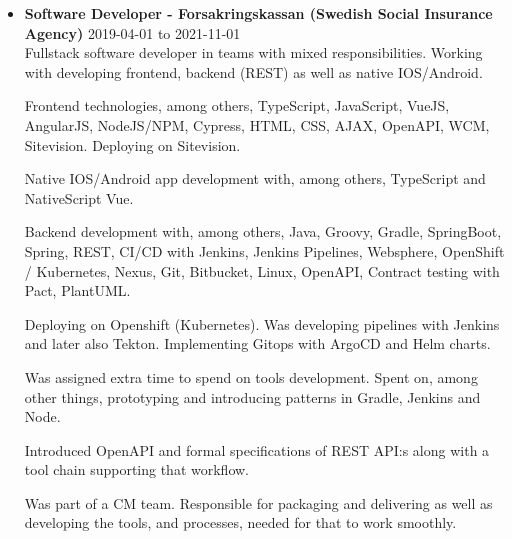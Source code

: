 \documentclass[a4paper]{article}
\begin{document}
\begin{itemize}
  \item \textbf{Software Developer - Forsakringskassan (Swedish Social Insurance Agency)} 2019-04-01 to 2021-11-01 \\

  Fullstack software developer in teams with mixed responsibilities. Working with developing frontend, backend (REST) as well as native IOS/Android.

  Frontend technologies, among others, TypeScript, JavaScript, VueJS, AngularJS, NodeJS/NPM, Cypress, HTML, CSS, AJAX, OpenAPI, WCM, Sitevision. Deploying on Sitevision.

  Native IOS/Android app development with, among others, TypeScript and NativeScript Vue.
  
  Backend development with, among others, Java, Groovy, Gradle, SpringBoot, Spring, REST, CI/CD with Jenkins, Jenkins Pipelines, Websphere, OpenShift / Kubernetes, Nexus, Git, Bitbucket, Linux, OpenAPI, Contract testing with Pact, PlantUML.

  Deploying on Openshift (Kubernetes). Was developing pipelines with Jenkins and later also Tekton. Implementing Gitops with ArgoCD and Helm charts.

  Was assigned extra time to spend on tools development. Spent on, among other things, prototyping and introducing patterns in Gradle, Jenkins and Node.
  
  Introduced OpenAPI and formal specifications of REST API:s along with a tool chain supporting that workflow.
  
  Was part of a CM team. Responsible for packaging and delivering as well as developing the tools, and processes, needed for that to work smoothly.
\end{itemize}
  
\end{document}
